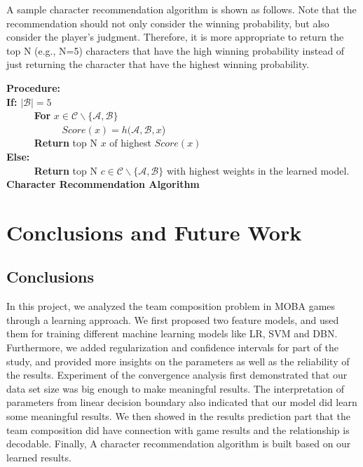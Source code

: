 \documentclass{article} %
\begin{document}
A sample character recommendation algorithm is shown as follows. Note that the recommendation should not only consider the winning probability, but also consider the player's judgment. Therefore, it is more appropriate to return the top N (e.g., N=5) characters that have the high winning probability instead of just returning the character that have the highest winning probability.

\begin{algorithm}[h]
{\bf Procedure:} \\

{\bf If:} $|\mathcal{B}| = 5$  \\
	~~~~~ {\bf For} $x \in \mathcal{C} \backslash \{\mathcal{A,B}\}$\\
	~~~~~  ~~~~~ $Score(x) = h(\mathcal{A,B},x$) \\
	~~~~~ {\bf Return} top N $x$ of highest $Score(x)$ \\

{\bf Else:} \\
    ~~~~~ {\bf Return} top N $c \in \mathcal{C} \backslash \{\mathcal{A,B}\}$ with highest weights in the learned model.\\

\caption{{\bf Character Recommendation Algorithm} \label{Algorithm}}
\end{algorithm}




\section{Conclusions and Future Work}

\subsection{Conclusions}

In this project, we analyzed the team composition problem in MOBA games through a learning approach. We first proposed two feature models, and used them for training different machine learning models like LR, SVM and DBN. Furthermore, we added regularization and confidence intervals for part of the study, and provided more insights on the parameters as well as the reliability of the results. Experiment of the convergence analysis first demonstrated that our data set size was big enough to make meaningful results. The interpretation of parameters from linear decision boundary also indicated that our model did learn some meaningful results. We then showed in the results prediction part that the team composition did have connection with game results and the relationship is decodable. Finally, A character recommendation algorithm is built based on our learned results.
\end{document}
